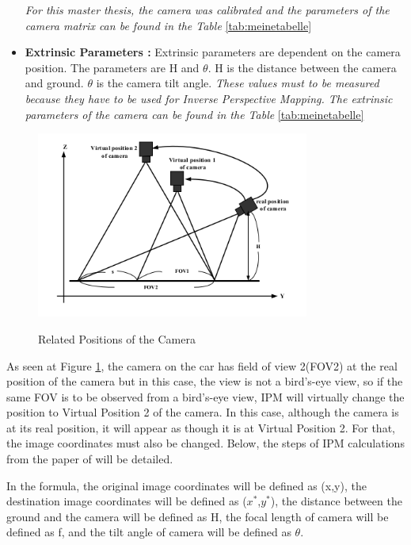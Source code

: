 \begin{itemize}
\emph{\color{blue}For this master thesis, the camera was calibrated and the parameters of the camera matrix can be found in the Table} \ref{tab:meinetabelle}


\item \textbf{Extrinsic Parameters :} Extrinsic parameters are dependent on the camera position. The parameters are H and $\theta$. H is the distance between the camera and ground. $\theta$ is the camera tilt angle. \emph{\color{blue}These values must to be measured because they have to be used for Inverse Perspective Mapping. The extrinsic parameters of the camera can be found in the Table} \ref{tab:meinetabelle} 
 
\end{itemize}
  
\begin{figure}[H]
\centering
  \includegraphics[width=0.8\textwidth]{./Bilder/Related_positions_of_the_camera.png}\label{Procedures_of_IPM_fig}
  \caption{Related Positions of the Camera \cite{IPM}}
\end{figure}

 As seen at Figure \ref{Procedures_of_IPM_fig}, the camera on the car has field of view 2(FOV2) at the real position of the camera but in this case, the view is not a bird's-eye view, so if the same FOV is to be observed from a bird's-eye view, IPM will virtually change the position to Virtual Position 2 of the camera. In this case, although the camera is at its real position, it will appear as though it is at Virtual Position 2. For that, the image coordinates must also be changed. Below, the steps of IPM calculations from the paper of \cite{IPM} will be detailed.
 
In the formula, the original image coordinates will be defined as (x,y), the destination image coordinates will be defined as ($x^*$,$y^*$), the distance between the ground and the camera will be defined as H, the focal length of camera will be defined as f, and the tilt angle of camera will be defined as $\theta$.
 
